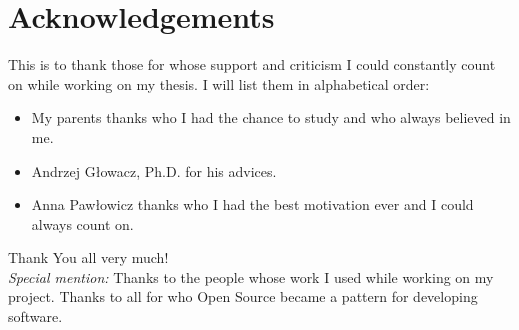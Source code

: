 \chapter{Acknowledgements}
This is to thank those for whose support and criticism I could constantly count on
while working on my thesis. I will list them in alphabetical order:
\begin{itemize}
	\item My parents thanks who I had the chance to study and who always believed in me.  
	\item Andrzej Głowacz, Ph.D. for his advices. 
	\item Anna Pawłowicz thanks who I had the best motivation ever and I could always count on.
\end{itemize}
Thank You all very much!\\

\emph{Special mention:} Thanks to the people whose work I used while working on my project.
Thanks to all for who Open Source became a pattern for developing software.
